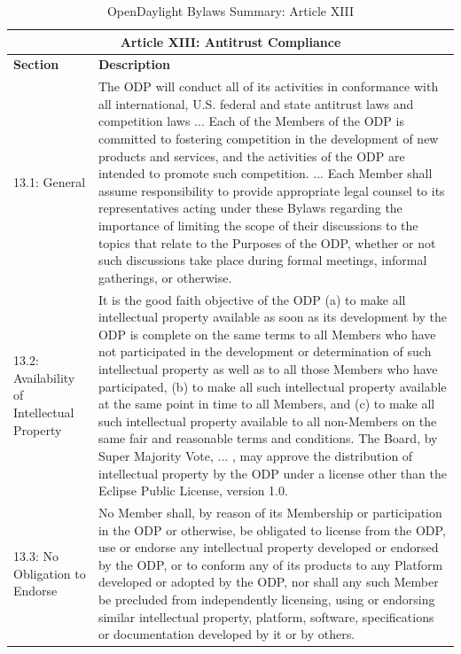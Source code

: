 \documentclass[a4paper, 12pt]{book}
\begin{document}
\begin{table}[H]
  \begin{center}
    \begin{tabular}{ | p{3cm} | p{12cm} | }
    \toprule
    \multicolumn {2}{|c|}{\textbf{Article XIII: Antitrust Compliance}} \\
    \hline
    \textbf{Section} & \textbf{Description} \\
    \hline
    13.1: General & The ODP will conduct all of its activities in conformance with all international, U.S. federal and state antitrust laws and competition laws ... Each of the Members of the ODP is committed to fostering competition in the development of new products and services, and the activities of the ODP are intended to promote such competition. ... Each Member shall assume responsibility to provide appropriate legal counsel to its representatives acting under these Bylaws regarding the importance of limiting the scope of their discussions to the topics that relate to the Purposes of the ODP, whether or not such discussions take place during formal meetings, informal gatherings, or otherwise.\\
    \hline
    13.2: Availability of Intellectual Property & It is the good faith objective of the ODP (a) to make all intellectual property available as soon as its development by the ODP is complete on the same terms to all Members who have not participated in the development or determination of such intellectual property as well as to all those Members who have participated, (b) to make all such intellectual property available at the same point in time to all Members, and (c) to make all such intellectual property available to all non-Members on the same fair and reasonable terms and conditions.  The Board, by Super Majority Vote, ... , may approve the distribution of intellectual property by the ODP under a license other than the Eclipse Public License, version 1.0.\\
    \hline
    13.3: No Obligation to Endorse & No Member shall, by reason of its Membership or participation in the ODP or otherwise, be obligated to license from the ODP, use or endorse any intellectual property developed or endorsed by the ODP, or to conform any of its products to any Platform developed or adopted by the ODP, nor shall any such Member be precluded from independently licensing, using or endorsing similar intellectual property, platform, software, specifications or documentation developed by it or by others.\\
    \bottomrule
    \end{tabular}
    \caption{OpenDaylight Bylaws Summary: Article XIII}
    \label{tab:odlbylaws-art13}
  \end{center}
\end{table}
\end{document}
